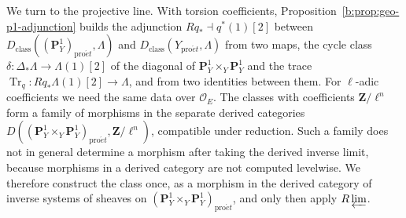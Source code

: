 \documentclass[11pt,a4paper]{article}
\numberwithin{equation}{section}
\theoremstyle{definition}
\theoremstyle{remark}
\newcommand{\proet}{\mathrm{pro}\acute{e}t}
\begin{document}
We turn to the projective line. With torsion coefficients,
Proposition~\ref{b:prop:geo-p1-adjunction} builds the adjunction
$Rq_*\dashv q^*(1)[2]$ between $D_{\mathrm{class}}((\mathbf P^1_Y)_{\proet},\Lambda)$
and $D_{\mathrm{class}}(Y_{\proet},\Lambda)$ from two maps, the cycle class
$\delta:\Delta_*\Lambda\to\Lambda(1)[2]$ of the diagonal of
$\mathbf P^1_Y\times_Y\mathbf P^1_Y$ and the trace
$\operatorname{Tr}_q:Rq_*\Lambda(1)[2]\to\Lambda$, and from two
identities between them. For $\ell$-adic coefficients we need the same
data over $\mathcal O_E$. The classes with coefficients
$\mathbf Z/\ell^n$ form a family of morphisms in the separate derived
categories $D((\mathbf P^1_Y\times_Y\mathbf P^1_Y)_{\proet},\mathbf Z/\ell^n)$, compatible under reduction. Such a
family does not in general determine a morphism after taking the derived
inverse limit, because morphisms in a derived category are not computed
levelwise. We therefore construct the class once, as a morphism in the
derived category of inverse systems of sheaves on
$(\mathbf P^1_Y\times_Y\mathbf P^1_Y)_{\proet}$, and only then apply
$R\varprojlim$.
\end{document}
